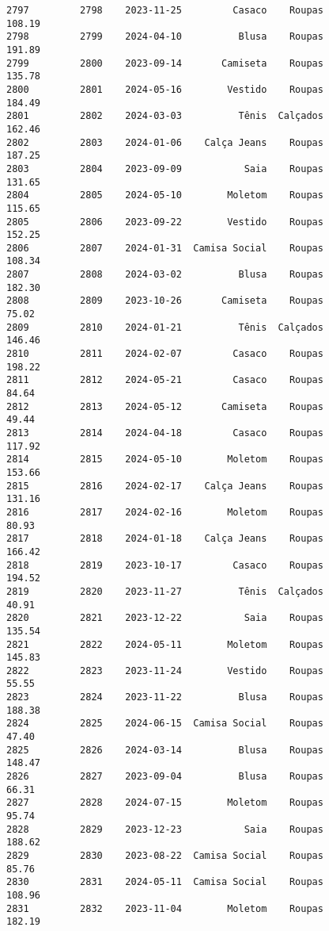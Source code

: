 \documentclass[11pt]{article}
\begin{document}
\begin{Verbatim}[commandchars=\\\{\}]
2797         2798    2023-11-25         Casaco    Roupas          108.19   
2798         2799    2024-04-10          Blusa    Roupas          191.89   
2799         2800    2023-09-14       Camiseta    Roupas          135.78   
2800         2801    2024-05-16        Vestido    Roupas          184.49   
2801         2802    2024-03-03          Tênis  Calçados          162.46   
2802         2803    2024-01-06    Calça Jeans    Roupas          187.25   
2803         2804    2023-09-09           Saia    Roupas          131.65   
2804         2805    2024-05-10        Moletom    Roupas          115.65   
2805         2806    2023-09-22        Vestido    Roupas          152.25   
2806         2807    2024-01-31  Camisa Social    Roupas          108.34   
2807         2808    2024-03-02          Blusa    Roupas          182.30   
2808         2809    2023-10-26       Camiseta    Roupas           75.02   
2809         2810    2024-01-21          Tênis  Calçados          146.46   
2810         2811    2024-02-07         Casaco    Roupas          198.22   
2811         2812    2024-05-21         Casaco    Roupas           84.64   
2812         2813    2024-05-12       Camiseta    Roupas           49.44   
2813         2814    2024-04-18         Casaco    Roupas          117.92   
2814         2815    2024-05-10        Moletom    Roupas          153.66   
2815         2816    2024-02-17    Calça Jeans    Roupas          131.16   
2816         2817    2024-02-16        Moletom    Roupas           80.93   
2817         2818    2024-01-18    Calça Jeans    Roupas          166.42   
2818         2819    2023-10-17         Casaco    Roupas          194.52   
2819         2820    2023-11-27          Tênis  Calçados           40.91   
2820         2821    2023-12-22           Saia    Roupas          135.54   
2821         2822    2024-05-11        Moletom    Roupas          145.83   
2822         2823    2023-11-24        Vestido    Roupas           55.55   
2823         2824    2023-11-22          Blusa    Roupas          188.38   
2824         2825    2024-06-15  Camisa Social    Roupas           47.40   
2825         2826    2024-03-14          Blusa    Roupas          148.47   
2826         2827    2023-09-04          Blusa    Roupas           66.31   
2827         2828    2024-07-15        Moletom    Roupas           95.74   
2828         2829    2023-12-23           Saia    Roupas          188.62   
2829         2830    2023-08-22  Camisa Social    Roupas           85.76   
2830         2831    2024-05-11  Camisa Social    Roupas          108.96   
2831         2832    2023-11-04        Moletom    Roupas          182.19   

\end{Verbatim}
\end{document}
